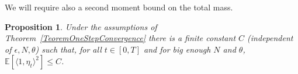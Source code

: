 \documentclass[12pt]{article}
\newenvironment {proof}{{\noindent\bf Proof }}{\hfill $\Box$ \medskip}
\newtheorem{proposition}[theorem]{Proposition}
\newcommand{\IE}{\mathbb E}
\newcommand{\comment}[1]{{\color{blue} \it #1}}
\begin{document}
% 
% 

We will require also a second moment bound on the total mass.

\begin{proposition}
Under the assumptions of Theorem~\ref{TeoremOneStepConvergence} there is a finite constant $C$ (independent of $\epsilon, N, \theta$) such that, for all $t \in [0,T]$ and for big enough $N$ and $\theta$, $\IE[ \langle 1, \eta_t \rangle^2] \leq C$.\label{Prop:SecondMomentMass}
\end{proposition} 
\end{document}
